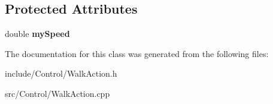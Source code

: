 \subsection*{Protected Attributes}
\begin{DoxyCompactItemize}
\item 
\hypertarget{classCartWheel_1_1WalkAction_ab6a3c378ebbb0d6084402f998ace6b54}{
double {\bfseries mySpeed}}
\label{classCartWheel_1_1WalkAction_ab6a3c378ebbb0d6084402f998ace6b54}

\end{DoxyCompactItemize}


The documentation for this class was generated from the following files:\begin{DoxyCompactItemize}
\item 
include/Control/WalkAction.h\item 
src/Control/WalkAction.cpp\end{DoxyCompactItemize}
